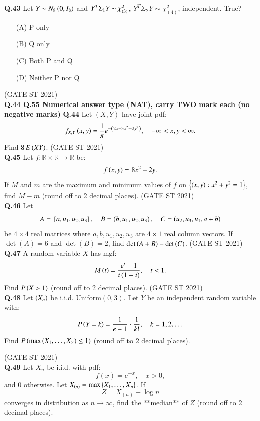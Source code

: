 \documentclass[journal,12pt,onecolumn]{IEEEtran}
\theoremstyle{remark}
\begin{document}
\textbf{Q.43}
Let $Y \sim N_8\left(0,I_8\right)$ and $Y^T\Sigma_1Y \sim \chi^2_{\left(3\right)}$, $Y^T\Sigma_2Y \sim \chi^2_{(4)}$, independent. True?
\begin{enumerate}
\item[(A)] P only
\item[(B)] Q only
\item[(C)] Both P and Q
\item[(D)] Neither P nor Q
\end{enumerate}
\hfill (GATE ST 2021) \\

\textbf{Q.44 \text{-} Q.55 Numerical answer type   (NAT), carry TWO mark each (no negative marks)}
\textbf{Q.44}
Let $(X,Y)$ have joint pdf:
\[
f_{X,Y}\left(x,y\right) = \frac{1}{\pi} e^{-\left(2x - 3x^2 - 2y^2\right)}, \quad -\infty < x,y < \infty.
\]
Find $8 \, E\left(XY\right)$.
\hfill (GATE ST 2021) \\

\textbf{Q.45}
Let $f: \mathbb{R} \times \mathbb{R} \to \mathbb{R}$ be:
\[
f\left(x,y\right)= 8x^2 - 2y.
\]
If $M$ and $m$ are the maximum and minimum values of $f$ on $\left\{ \left(x,y\right) : x^2 + y^2 = 1 \right\}$,  
find $M - m$ (round off to 2 decimal places).
\hfill (GATE ST 2021) \\


\textbf{Q.46}
Let 
\[
A = {}\left[a, u_1, u_2, u_3\right], \quad
B = \left(b, u_1, u_2, u_3\right), \quad
C = \left(u_2, u_3, u_1, a+b\right)
\]
be $4\times 4$ real matrices where $a,b,u_1,u_2,u_3$ are $4 \times 1$ real column vectors.  
If $\det(A) = 6$ and $\det(B) = 2$, find $\det\left(A+B\right) - \det\left(C\right)$.
\hfill (GATE ST 2021) \\
\textbf{Q.47}
A random variable $X$ has mgf:
\[
M\left(t\right) = \frac{e^t - 1}{t\left(1-t\right)}, \quad t < 1.
\]
Find $P\left(X > 1\right)$ (round off to 2 decimal places).
\hfill (GATE ST 2021) \\
\textbf{Q.48}
Let $\left( X_n \right)$ be i.i.d. $\text{Uniform}(0,3)$.  
Let $Y$ be an independent random variable with:
\[
P\left(Y = k\right) = \frac{1}{e-1} \cdot \frac{1}{k!}, \quad k = 1,2,\dots
\]
Find $P\left( \max\left( X_1,\dots,X_Y \right) \le 1 \right)$ (round off to 2 decimal places).

\hfill (GATE ST 2021) \\


\textbf{Q.49}
Let  $X_n$ be i.i.d. with pdf:
\[
f(x) = e^{-x}, \quad x > 0,
\]
and $0$ otherwise.  
Let $X_{(n)} = \max\left\{ X_1,\dots,X_n \right\}$. If 
\[
Z = X_{(n)} - \log n
\]
converges in distribution as $n \to \infty$, find the **median** of $Z$ (round off to 2 decimal places).
\end{document}
